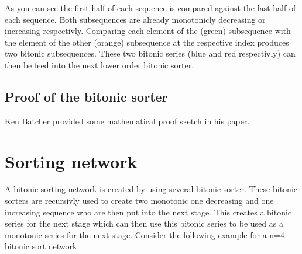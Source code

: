 \documentclass{article}
\newcommand{\compareBlock}[2][]{
    \pgfkeys{/compareBlock, default, #1}%
    \coordinate (\cbName_a) at ($(0, 1.33) + #2$);
    \coordinate (\cbName_b) at ($(0, 0.66) + #2$);
    \coordinate (\cbName_l) at ($(1.5, 0.66) + #2$);
    \coordinate (\cbName_h) at ($(1.5, 1.33) + #2$);

    \draw[color=\cbCA] (\cbName_a) -- ++(0.2, 0)node[anchor=west]{\cbA};
    \draw[color=\cbCB] (\cbName_b) -- ++(0.2, 0)node[anchor=west]{\cbB};
    \draw[color=\cbCL] (\cbName_l) -- ++(-0.2, 0)node[anchor=east]{\cbL};
    \draw[color=\cbCH] (\cbName_h) -- ++(-0.2, 0)node[anchor=east]{\cbH};
    \draw[draw=black] #2 rectangle ++(1.5,2);
}
\newcommand{\connectCB}[3]{
    \draw[color=#3] (#1) -- (#2);
}
\newcommand{\outputCB}[3]{
    \coordinate (#2) at ($(#1_h) + (0.25, 0)$);
    \coordinate (#3) at ($(#1_l) + (0.25, 0)$);
    \node at (#2) [anchor=west]{#2};
    \node at (#3) [anchor=west]{#3};
    \connectCB{#2}{#1_h}{black}
    \connectCB{#3}{#1_l}{black}
}
\begin{document}
As you can see the first half of each sequence is compared against the last half of each sequence. 
Both subsequences are already monotonicly decreasing or increasing respectivly.
Comparing each element of the (green) subsequence with the element of the other (orange) subsequence at the respective index produces two bitonic subsequences.
These two bitonic series (blue and red respectivly) can then be feed into the next lower order bitonic sorter.

\subsection{Proof of the bitonic sorter}

Ken Batcher provided some mathematical proof sketch in his paper.

\section{Sorting network}

A bitonic sorting network is created by using several bitonic sorter. 
These bitonic sorters are recursivly used to create two monotonic one decreasing and one increasing sequence who are then put into the next stage.
This creates a bitonic series for the next stage which can then use this bitonic series to be used as a monotonic series for the next stage.
Consider the following example for a n=4 bitonic sort network.

\end{document}
